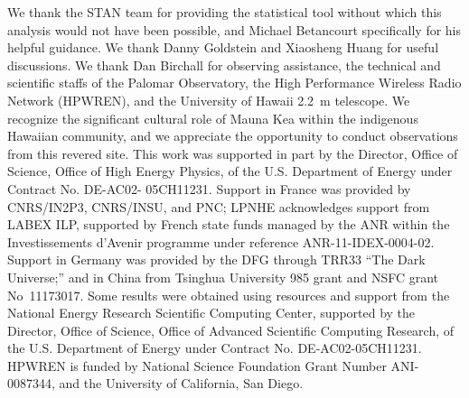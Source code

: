 \documentclass[trackchanges]{aastex61}   	%
\begin{document}
\acknowledgments
We thank the STAN team for providing the statistical tool without which this analysis would not have been possible,
and Michael Betancourt specifically for his helpful guidance.  We thank Danny Goldstein and
Xiaosheng Huang for useful discussions.
We thank Dan Birchall for observing assistance, the technical and
scientific staffs of the Palomar Observatory, the High Performance
Wireless Radio Network (HPWREN), and the University of Hawaii 2.2~m
telescope.  We recognize the significant cultural role of Mauna Kea
within the indigenous Hawaiian community, and we appreciate the
opportunity to conduct observations from this revered site.  This
work was supported in part by the Director, Office of Science,
Office of High Energy Physics, of the U.S. Department of Energy
under Contract No. DE-AC02- 05CH11231.  Support in France was
provided by CNRS/IN2P3, CNRS/INSU, and PNC; LPNHE acknowledges
support from LABEX ILP, supported by French state funds managed by
the ANR within the Investissements d'Avenir programme under reference
ANR-11-IDEX-0004-02.  Support in Germany was provided by the DFG
through TRR33 ``The Dark Universe;'' and in China from Tsinghua
University 985 grant and NSFC grant No~11173017.  Some results were
obtained using resources and support from the National Energy
Research Scientific Computing Center, supported by the Director,
Office of Science, Office of Advanced Scientific Computing Research,
of the U.S. Department of Energy under Contract No. DE-AC02-05CH11231.
HPWREN is funded by National Science Foundation Grant Number
ANI-0087344, and the University of California, San Diego.
\end{document}
